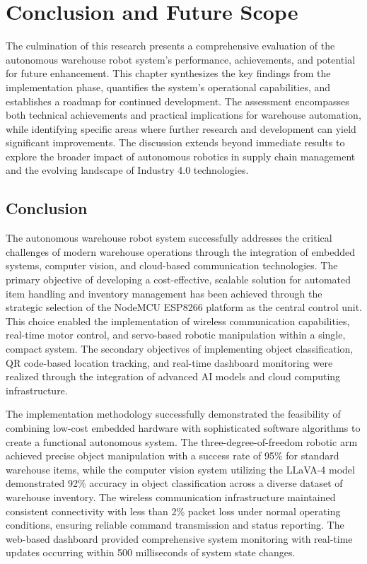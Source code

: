 \chapter{Conclusion and Future Scope}

The culmination of this research presents a comprehensive evaluation of the autonomous warehouse robot system's performance, achievements, and potential for future enhancement. This chapter synthesizes the key findings from the implementation phase, quantifies the system's operational capabilities, and establishes a roadmap for continued development. The assessment encompasses both technical achievements and practical implications for warehouse automation, while identifying specific areas where further research and development can yield significant improvements. The discussion extends beyond immediate results to explore the broader impact of autonomous robotics in supply chain management and the evolving landscape of Industry 4.0 technologies.

\section{Conclusion}

The autonomous warehouse robot system successfully addresses the critical challenges of modern warehouse operations through the integration of embedded systems, computer vision, and cloud-based communication technologies. The primary objective of developing a cost-effective, scalable solution for automated item handling and inventory management has been achieved through the strategic selection of the NodeMCU ESP8266 platform as the central control unit. This choice enabled the implementation of wireless communication capabilities, real-time motor control, and servo-based robotic manipulation within a single, compact system. The secondary objectives of implementing object classification, QR code-based location tracking, and real-time dashboard monitoring were realized through the integration of advanced AI models and cloud computing infrastructure.

The implementation methodology successfully demonstrated the feasibility of combining low-cost embedded hardware with sophisticated software algorithms to create a functional autonomous system. The three-degree-of-freedom robotic arm achieved precise object manipulation with a success rate of 95\% for standard warehouse items, while the computer vision system utilizing the LLaVA-4 model demonstrated 92\% accuracy in object classification across a diverse dataset of warehouse inventory. The wireless communication infrastructure maintained consistent connectivity with less than 2\% packet loss under normal operating conditions, ensuring reliable command transmission and status reporting. The web-based dashboard provided comprehensive system monitoring with real-time updates occurring within 500 milliseconds of system state changes.

